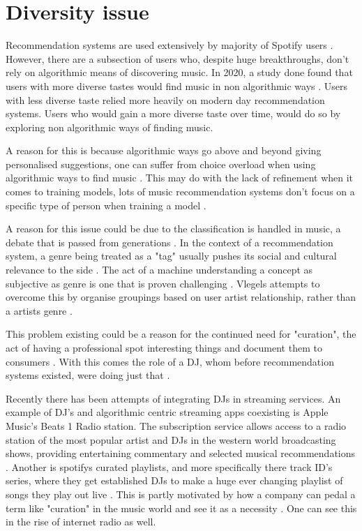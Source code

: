 \section{Diversity issue}

Recommendation systems are used extensively by majority of Spotify users \citep{spotify_spotify_2020}. However, there are a subsection of users who, despite huge breakthroughs, don't rely on algorithmic means of discovering music. In 2020, a study done found that users with more diverse tastes would find music in non algorithmic ways \citep{anderson_algorithmic_2020}. Users with less diverse taste relied more heavily on modern day recommendation systems. Users who would gain a more diverse taste over time, would do so by exploring non algorithmic ways of finding music.

A reason for this is because algorithmic ways go above and beyond giving personalised suggestions, one can suffer from choice overload when using algorithmic ways to find music \citep{iyengar_rethinking_1999}. This may do with the lack of refinement when it comes to training models, lots of music recommendation systems don't focus on a specific type of person when training a model \citep{laplante_improving_2014}.

A reason for this issue could be due to the classification is handled in music, a debate that is passed from generations \citep{moles_sociodynamique_2019} \citep{dimaggio_classification_1987} \citep{bourdieu_distinction_2010}. In the context of a recommendation system, a genre being treated as a "tag" usually pushes its social and cultural relevance to the side \citep{porcaro_diversity_2021}. The act of a machine understanding a concept as subjective as genre is one that is proven challenging \citep{nurnberger_survey_2014}. Vlegels attempts to overcome this by organise groupings based on user artist relationship, rather than a artists genre \citep{vlegels_music_2017}.

This problem existing could be a reason for the continued need for "curation", the act of having a professional spot interesting things and document them to consumers \citep{barna_perfect_2017}. With this comes the role of a DJ, whom before recommendation systems existed, were doing just that \citep{percival_music_2011}. 

Recently there has been attempts of integrating DJs in streaming services.  An example of DJ's and algorithmic centric streaming apps coexisting is Apple Music's Beats 1 Radio station. The subscription service allows access to a radio station of the most popular artist and DJs in the western world broadcasting shows, providing entertaining commentary and selected musical recommendations \citep{dms_apple_2020}. Another is spotifys curated playlists, and more specifically there track ID's series, where they get established DJs to make a huge ever changing playlist of songs they play out live \citep{spotify_introducing_2020}. This is partly motivated by how a company can pedal a term like "curation" in the music world and see it as a necessity \citep{barna_perfect_2017}. One can see this in the rise of internet radio as well.  

